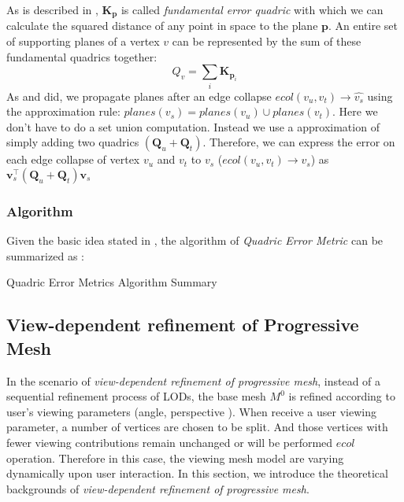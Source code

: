 As is described in \cite{Garland:1997:SSU}, $\textbf{K}_{\textbf{p}}$ is called \emph{fundamental error quadric} with which we can calculate the squared distance of any point in space to the plane $\textbf{p}$. An entire set of supporting planes of a vertex $v$ can be represented by the sum of these fundamental quadrics together: 
\begin{equation}
Q_v=\sum_{i} \textbf{K}_{\textbf{p}_i}
\label{sumofkp}
\end{equation}
As \cite{Garland:1997:SSU} and \cite{RonfardR:96} did, we propagate planes after an edge collapse $ecol(v_u,v_t)\rightarrow\hat{v_s}$ using the approximation rule: $planes(v_s)=planes(v_u)\cup planes(v_t)$. Here we don't have to do a set union computation. Instead we use a approximation of simply adding two quadrics $(\textbf{Q}_u+\textbf{Q}_t)$. Therefore, we can express the error on each edge collapse of vertex $v_u$ and $v_t$ to $v_s$ ($ecol(v_u,v_t)\rightarrow v_s$) as $\textbf{v}_s^\intercal(\textbf{Q}_u+\textbf{Q}_t)\textbf{v}_s$



\subsubsection{Algorithm}
\label{QEM:Algorithm}
Given the basic idea stated in , the algorithm of \emph{Quadric Error Metric} can be summarized as :
\begin{algorithm}                     
\caption{Quadric Error Metrics Algorithm Summary}          
\label{QEM:algorithmlist}                           
\begin{algorithmic}      
	\ENDFOR
	\ENDWHILE
\end{algorithmic}
\end{algorithm}

\subsection{View-dependent refinement of Progressive Mesh}
\label{theo:vdpm}
In the scenario of \emph{view-dependent refinement of progressive mesh}, instead of a sequential refinement process of LODs, the base mesh $M^0$ is refined according to user's viewing parameters (angle, perspective \etc). When receive a user viewing parameter, a number of vertices are chosen to be split. And those vertices with fewer viewing contributions remain unchanged or will be performed $ecol$ operation. Therefore in this case, the viewing mesh model are varying dynamically upon user interaction. In this section, we introduce the theoretical backgrounds of \emph{view-dependent refinement of progressive mesh}. 

